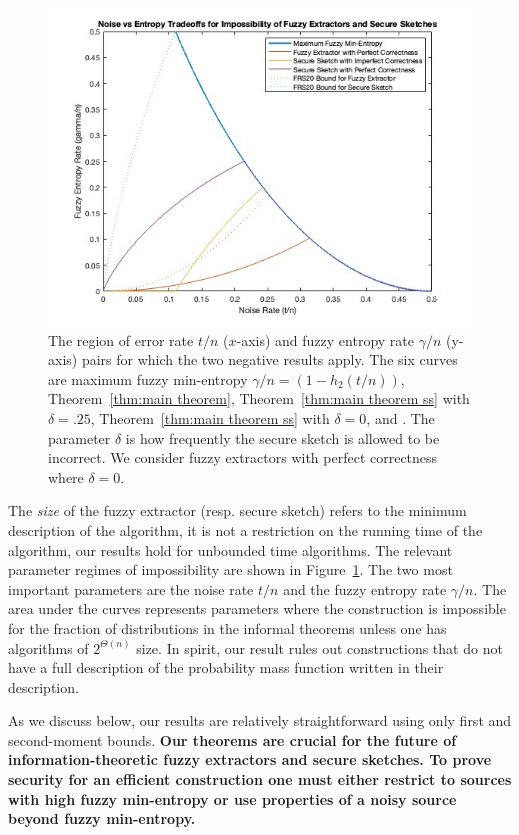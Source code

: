 \begin{figure}[t]
\centering
\includegraphics[width=.9\textwidth]{EntropyvsError.jpg}
\caption{The region of error rate $t/n$ ($x$-axis) and fuzzy entropy rate $\gamma/n$ (y-axis) pairs for which the two negative results apply.  The six curves are maximum fuzzy min-entropy $\gamma/n = (1-h_2(t/n))$, Theorem~\ref{thm:main theorem}, Theorem~\ref{thm:main theorem ss} with $\delta=.25$,  Theorem~\ref{thm:main theorem ss} with $\delta =0$, \cite[Theorem 5.1]{fuller2020fuzzy} and \cite[Theorem 7.2]{fuller2020fuzzy}. The parameter $\delta$ is how frequently the secure sketch is allowed to be incorrect.  We consider fuzzy extractors with perfect correctness where $\delta=0$.}
\label{fig:param regime}
\end{figure}
The \emph{size} of the fuzzy extractor (resp. secure sketch) refers to the minimum description of the algorithm, it is not a restriction on the running time of the algorithm, our results hold for unbounded time algorithms. 
 The relevant parameter regimes of impossibility are shown in Figure~\ref{fig:param regime}.  The two most important parameters are the noise rate $t/n$ and the fuzzy entropy rate $\gamma/n$. The area under the curves represents parameters where the construction is impossible for the fraction of distributions in the informal theorems unless one has algorithms of $2^{\Theta(n)}$ size.
In spirit, our result rules out constructions that do not have a full description of the probability mass function written in their description.  

As we discuss below, our results are relatively straightforward using only first and second-moment bounds.    \textbf{Our theorems are crucial for the future of information-theoretic fuzzy extractors and secure sketches.  To prove security for an efficient construction one must either restrict to sources with high fuzzy min-entropy or use properties of a noisy source beyond fuzzy min-entropy.}  %


